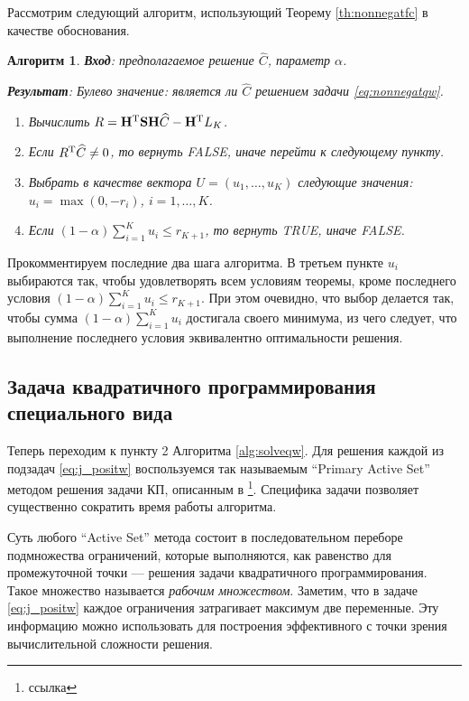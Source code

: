 \documentclass[10pt]{article}
\newtheorem{algorithm}{Алгоритм}
\begin{document}
Рассмотрим следующий алгоритм, использующий Теорему \ref{th:nonnegatfc} в качестве обоснования.
\begin{algorithm}
	\label{alg:nonnegatfc}
	\textbf{Вход}: предполагаемое решение $\widehat C$, параметр $\alpha$.
	
	\textbf{Результат}:
	Булево значение: является ли $\widehat C$ решением задачи \eqref{eq:nonnegatqw}.
	
	\begin{enumerate}
		\item Вычислить $R = \mathbf{H}^{\mathrm{T}} \mathbf{S} \mathbf{H} \widehat C - \mathbf{H}^{\mathrm{T}} L_K$.
		\item Если $R^{\mathrm{T}} \widehat C \neq 0$, то вернуть FALSE, иначе перейти к следующему пункту.
		\item Выбрать в качестве вектора $U = (u_1, \ldots, u_K)$ следующие значения: $u_i = \max(0, -r_i)$, $i = 1, \ldots, K$.
		\item Если $(1 - \alpha) \sum_{i=1}^K u_i \le r_{K+1}$, то вернуть TRUE, иначе FALSE.
	\end{enumerate}
\end{algorithm}

Прокомментируем последние два шага алгоритма. В третьем пункте $u_i$ выбираются так, чтобы удовлетворять всем условиям теоремы, кроме последнего условия $(1 - \alpha) \sum_{i=1}^K u_i \le r_{K+1}$. При этом очевидно, что выбор делается так, чтобы сумма $(1 - \alpha) \sum_{i=1}^K u_i$ достигала своего минимума, из чего следует, что выполнение последнего условия эквивалентно оптимальности решения.


\subsection{Задача квадратичного программирования специального вида} \label{subsect:graphprog}
Теперь переходим к пункту 2 Алгоритма \ref{alg:solveqw}. Для решения каждой из подзадач \eqref{eq:j_positw} воспользуемся так называемым ``Primary Active Set'' методом решения задачи КП, описанным в \footnote{ссылка}. Специфика задачи позволяет существенно сократить время работы алгоритма.

Суть любого ``Active Set'' метода состоит в последовательном переборе подмножества ограничений, которые выполняются, как равенство для промежуточной точки --- решения задачи квадратичного программирования. Такое множество называется \emph{рабочим множеством}. Заметим, что в задаче \eqref{eq:j_positw} каждое ограничения затрагивает максимум две переменные. Эту информацию можно использовать для построения эффективного с точки зрения вычислительной сложности решения.
\end{document}
